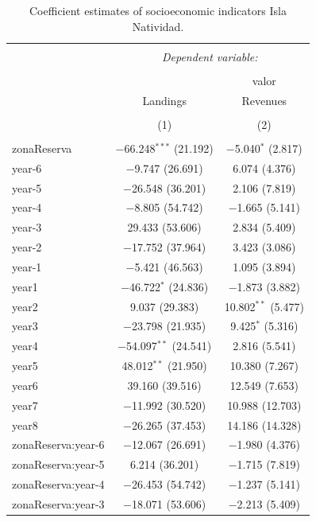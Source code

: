 \documentclass[utf8]{frontiers_suppmat} %
\begin{document}
\clearpage

\begin{table}[!htbp] \centering 
  \caption{Coefficient estimates of socioeconomic indicators Isla Natividad.} 
  \label{} 
\tiny 
\begin{tabular}{@{\extracolsep{1pt}}lcc} 
\\[-1.8ex]\hline 
\hline \\[-1.8ex] 
 & \multicolumn{2}{c}{\textit{Dependent variable:}} \\ 
\cline{2-3} 
\\[-1.8ex] &  & valor \\ 
 & Landings & Revenues \\ 
\\[-1.8ex] & (1) & (2)\\ 
\hline \\[-1.8ex] 
 zonaReserva & $-$66.248$^{***}$ (21.192) & $-$5.040$^{*}$ (2.817) \\ 
  year-6 & $-$9.747 (26.691) & 6.074 (4.376) \\ 
  year-5 & $-$26.548 (36.201) & 2.106 (7.819) \\ 
  year-4 & $-$8.805 (54.742) & $-$1.665 (5.141) \\ 
  year-3 & 29.433 (53.606) & 2.834 (5.409) \\ 
  year-2 & $-$17.752 (37.964) & 3.423 (3.086) \\ 
  year-1 & $-$5.421 (46.563) & 1.095 (3.894) \\ 
  year1 & $-$46.722$^{*}$ (24.836) & $-$1.873 (3.882) \\ 
  year2 & 9.037 (29.383) & 10.802$^{**}$ (5.477) \\ 
  year3 & $-$23.798 (21.935) & 9.425$^{*}$ (5.316) \\ 
  year4 & $-$54.097$^{**}$ (24.541) & 2.816 (5.541) \\ 
  year5 & 48.012$^{**}$ (21.950) & 10.380 (7.267) \\ 
  year6 & 39.160 (39.516) & 12.549 (7.653) \\ 
  year7 & $-$11.992 (30.520) & 10.988 (12.703) \\ 
  year8 & $-$26.265 (37.453) & 14.186 (14.328) \\ 
  zonaReserva:year-6 & $-$12.067 (26.691) & $-$1.980 (4.376) \\ 
  zonaReserva:year-5 & 6.214 (36.201) & $-$1.715 (7.819) \\ 
  zonaReserva:year-4 & $-$26.453 (54.742) & $-$1.237 (5.141) \\ 
  zonaReserva:year-3 & $-$18.071 (53.606) & $-$2.213 (5.409) \\ 

\end{tabular}
\end{table}
\end{document}
